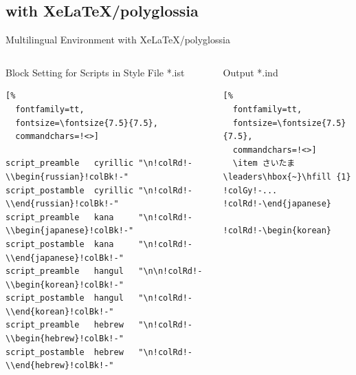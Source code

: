 \documentclass[aspectratio=169,10pt]{beamer}
\begin{document}
\subsection{with XeLaTeX/polyglossia}
\begin{frame}[fragile]{Multilingual Environment with XeLaTeX/polyglossia}
\begin{columns}
\begin{column}{72mm}
\begin{exampleblock}{Block Setting for Scripts in Style File *.ist}
\setmonofont{Noto Sans Mono CJK JP}
\begin{Verbatim}[%
  fontfamily=tt,
  fontsize=\fontsize{7.5}{7.5},
  commandchars=!<>]

script_preamble   cyrillic "\n!colRd!-\\begin{russian}!colBk!-"
script_postamble  cyrillic "\n!colRd!-\\end{russian}!colBk!-"
script_preamble   kana     "\n!colRd!-\\begin{japanese}!colBk!-"
script_postamble  kana     "\n!colRd!-\\end{japanese}!colBk!-"
script_preamble   hangul   "\n\n!colRd!-\\begin{korean}!colBk!-"
script_postamble  hangul   "\n!colRd!-\\end{korean}!colBk!-"
script_preamble   hebrew   "\n!colRd!-\\begin{hebrew}!colBk!-"
script_postamble  hebrew   "\n!colRd!-\\end{hebrew}!colBk!-"

\end{Verbatim}
\end{exampleblock}
\end{column}

\begin{column}{64mm}
\begin{exampleblock}{Output *.ind}
\setmonofont{Noto Sans Mono CJK JP}
\begin{Verbatim}[%
  fontfamily=tt,
  fontsize=\fontsize{7.5}{7.5},
  commandchars=!<>]
  \item さいたま\leaders\hbox{~}\hfill {1}
!colGy!-...
!colRd!-\end{japanese}

!colRd!-\begin{korean}


\end{Verbatim}
\end{exampleblock}
\end{column}
\end{columns}
\end{frame}
\end{document}

